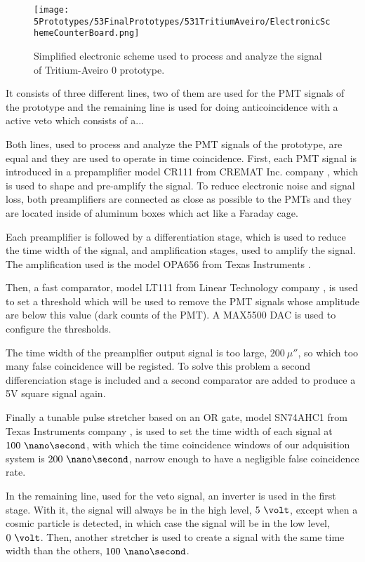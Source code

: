 \begin{figure}[h]
\centering
\texttt{[image: 5Prototypes/53FinalPrototypes/531TritiumAveiro/ElectronicSchemeCounterBoard.png]}
\caption{Simplified electronic scheme used to process and analyze the signal of Tritium-Aveiro 0 prototype. \label{fig:ElectronicSchemCounterBoard}}
\end{figure}

It consists of three different lines, two of them are used for the PMT signals of the prototype and the remaining line is used for doing anticoincidence with a active veto which consists of a...

Both lines, used to process and analyze the PMT signals of the prototype, are equal and they are used to operate in time coincidence. First, each PMT signal is introduced in a prepamplifier model CR111 from CREMAT Inc. company \cite{CREMATPreAmplifierDataSheet}, which is used to shape and pre-amplify the signal. To reduce electronic noise and signal loss, both preamplifiers are connected as close as possible to the PMTs and they are located inside of aluminum boxes which act like a Faraday cage.

Each preamplifier is followed by a differentiation stage, which is used to reduce the time width of the signal, and amplification stages, used to amplify the signal. The amplification used is the model OPA656 from Texas Instruments \cite{OPA656}. 

Then, a fast comparator, model LT111 from Linear Technology company \cite{LT111}, is used to set a threshold which will be used to remove the PMT signals whose amplitude are below this value (dark counts of the PMT). A MAX5500 DAC is used to configure the thresholds.

The time width of the preamplfier output signal is too large, $200~\mu\second$, so which too many false coincidence will be registed. To solve this problem a second differenciation stage is included and a second comparator are added to produce a 5V square signal again.

Finally a tunable pulse stretcher based on an OR gate, model SN74AHC1 from Texas Instruments company \cite{Stretcher}, is used to set the time width of each signal at $100~\nano\second$, with which the time coincidence windows of our adquisition system is $200~\nano\second$, narrow enough to have a negligible false coincidence rate.

In the remaining line, used for the veto signal, an inverter is used in the first stage. With it, the signal will always be in the high level, $5~\volt$, except when a cosmic particle is detected, in which case the signal will be in the low level, $0~\volt$. Then, another stretcher is used to create a signal with the same time width than the others, $100~\nano\second$.

